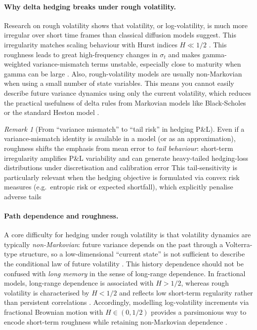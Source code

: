 \documentclass[12pt,a4paper]{article}
\theoremstyle{definition}
\theoremstyle{plain}
\theoremstyle{remark}
\newtheorem{remark}{Remark}[section]
\theoremstyle{plain}
\begin{document}
\paragraph{Why delta hedging breaks under rough volatility.}
Research on rough volatility shows that volatility, or log-volatility, is much more irregular over short time frames than classical diffusion models suggest. This irregularity matches scaling behaviour with Hurst indices $H\ll 1/2$ \cite{GatheralRough}.
This roughness leads to great high-frequency changes in $\sigma_t$ and makes gamma-weighted variance-mismatch terms unstable, especially close to maturity when gamma can be large \cite{GatheralRough,BayerFriz2016}.
Also, rough-volatility models are usually non-Markovian when using a small number of state variables. This means you cannot easily describe future variance dynamics using only the current volatility, which reduces the practical usefulness of delta rules from Markovian models like Black-Scholes or the standard Heston model \cite{Heston1993,GatheralRough,BayerFriz2016}.

\begin{remark}[From ``variance mismatch'' to ``tail risk'' in hedging P\&L]\label{rem:variance_to_tail}
Even if a variance-mismatch identity is available in a model (or as an approximation), roughness shifts the emphasis from mean error to \emph{tail behaviour}: short-term irregularity amplifies P\&L variability and can generate heavy-tailed hedging-loss distributions under discretisation and calibration error \cite{GatheralRough,BayerFriz2016,FoellmerSchied2016}
This tail-sensitivity is particularly relevant when the hedging objective is formulated via convex risk measures (e.g.\ entropic risk or expected shortfall), which explicitly penalise adverse tails \cite{FoellmerSchied2016,Buehler2019DeepHedging}
\end{remark}

\paragraph{Path dependence and roughness.}
A core difficulty for hedging under rough volatility is that volatility dynamics are typically \emph{non-Markovian}: future variance depends on the past through a Volterra-type structure, so a low-dimensional ``current state'' is not sufficient to describe the conditional law of future volatility \cite{GatheralRough,BayerFriz2016}. 
This history dependence should not be confused with \emph{long memory} in the sense of long-range dependence. In fractional models, long-range dependence is associated with $H>1/2$, whereas rough volatility is characterised by $H<1/2$ and reflects low short-term regularity rather than persistent correlations \cite{GatheralRough}. 
Accordingly, modelling log-volatility increments via fractional Brownian motion with $H\in(0,1/2)$ provides a parsimonious way to encode short-term roughness while retaining non-Markovian dependence \cite{GatheralRough}.
\end{document}
